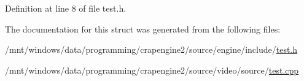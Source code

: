 Definition at line 8 of file test.\+h.



The documentation for this struct was generated from the following files\+:\begin{DoxyCompactItemize}
\item 
/mnt/windows/data/programming/crapengine2/source/engine/include/\hyperlink{engine_2include_2test_8h}{test.\+h}\item 
/mnt/windows/data/programming/crapengine2/source/video/source/\hyperlink{video_2source_2test_8cpp}{test.\+cpp}\end{DoxyCompactItemize}
